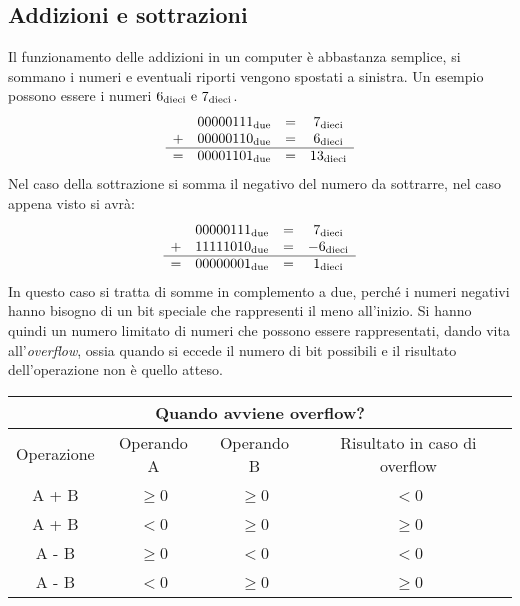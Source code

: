\documentclass[a4paper,12pt]{article}
\theoremstyle{break}
\numberwithin{equation}{section}
\begin{document}
\subsection{Addizioni e sottrazioni}
Il funzionamento delle addizioni in un computer è abbastanza semplice, si sommano i numeri e eventuali riporti vengono spostati a sinistra. Un esempio possono essere i numeri \(6_{\mbox{\scriptsize dieci}} \mbox{ e } 7_{\mbox{\scriptsize dieci}}\).
\[
\begin{array}{cccc}
    & 00000111_{\mbox{\scriptsize due}} & = & 7_{\mbox{\scriptsize dieci}} \\
    + & 00000110_{\mbox{\scriptsize due}} & = & 6_{\mbox{\scriptsize dieci}} \\
    \hline
    = & 00001101_{\mbox{\scriptsize due}} & = & 13_{\mbox{\scriptsize dieci}}
\end{array}    
\]
Nel caso della sottrazione si somma il negativo del numero da sottrarre, nel caso appena visto si avrà: 
\[
\begin{array}{cccc}
    & 00000111_{\mbox{\scriptsize due}} & = & 7_{\mbox{\scriptsize dieci}} \\
    + & 11111010_{\mbox{\scriptsize due}} & = & -6_{\mbox{\scriptsize dieci}} \\
    \hline
    = & 00000001_{\mbox{\scriptsize due}} & = & 1_{\mbox{\scriptsize dieci}}
\end{array}    
\]
In questo caso si tratta di somme in complemento a due, perché i numeri negativi hanno bisogno di un bit speciale che rappresenti il meno all'inizio. Si hanno quindi un numero limitato di numeri che possono essere rappresentati, dando vita all'\textit{overflow}, ossia quando si eccede il numero di bit possibili e il risultato dell'operazione non è quello atteso.
\begin{center}
\begin{tabular}{|c|c|c|c|}
    \hline
    \multicolumn{4}{|c|}{Quando avviene overflow?} \\
    \hline
    Operazione & Operando A & Operando B & Risultato in caso di overflow \\
    \hline
    A + B & \(\geq\)0 & \(\geq\)0 & \(<\)0 \\
    \hline
    A + B & \(<\)0 & \(\geq\)0 & \(\geq\)0 \\
    \hline
    A - B & \(\geq\)0 & \(<\)0 & \(<\)0 \\
    \hline
    A - B & \(<\)0 & \(\geq\)0 & \(\geq\)0 \\
    \hline
\end{tabular} 
\end{center}
\end{document}
